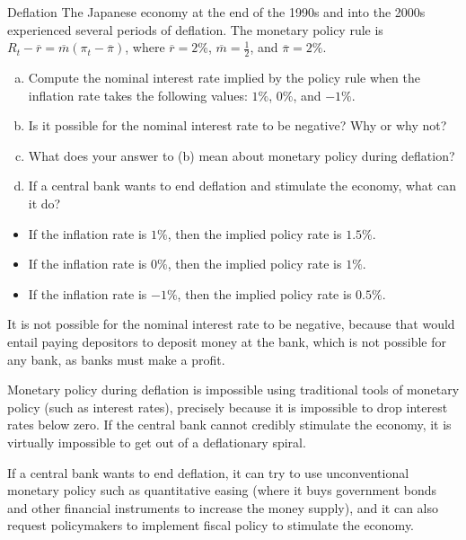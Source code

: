 \documentclass[10pt]{extarticle}
\begin{document}
  \begin{problem}{Deflation}
    The Japanese economy at the end of the 1990s and into the 2000s experienced several periods of deflation. The monetary policy rule is $R_t -\overline{r} = \overline{m}(\pi_t - \overline{\pi})$, where $\overline{r} = 2\%$, $\overline{m} = \frac{1}{2}$, and $\overline{\pi} = 2\%$.
    \begin{enumerate}[(a)]
      \item Compute the nominal interest rate implied by the policy rule when the inflation rate takes the following values: $1\%$, $0\%$, and $-1\%$.
      \item Is it possible for the nominal interest rate to be negative? Why or why not?
      \item What does your answer to (b) mean about monetary policy during deflation?
      \item If a central bank wants to end deflation and stimulate the economy, what can it do?
    \end{enumerate}
    \tcblower
    \begin{tcolorbox}[colback = white, title = (a), breakable]
      \begin{itemize}
        \item If the inflation rate is $1\%$, then the implied policy rate is $1.5\%$.
        \item If the inflation rate is $0\%$, then the implied policy rate is $1\%$.
        \item If the inflation rate is $-1\%$, then the implied policy rate is $0.5\%$.
      \end{itemize}
    \end{tcolorbox}
    \begin{tcolorbox}[colback = white, title = (b), breakable]
      It is not possible for the nominal interest rate to be negative, because that would entail paying depositors to deposit money at the bank, which is not possible for any bank, as banks must make a profit.
    \end{tcolorbox}
    \begin{tcolorbox}[colback = white, title = (c), breakable]
      Monetary policy during deflation is impossible using traditional tools of monetary policy (such as interest rates), precisely because it is impossible to drop interest rates below zero. If the central bank cannot credibly stimulate the economy, it is virtually impossible to get out of a deflationary spiral.
    \end{tcolorbox}
    \begin{tcolorbox}[colback = white, title = (d), breakable]
      If a central bank wants to end deflation, it can try to use unconventional monetary policy such as quantitative easing (where it buys government bonds and other financial instruments to increase the money supply), and it can also request policymakers to implement fiscal policy to stimulate the economy.
    \end{tcolorbox}
  \end{problem}
\end{document}

